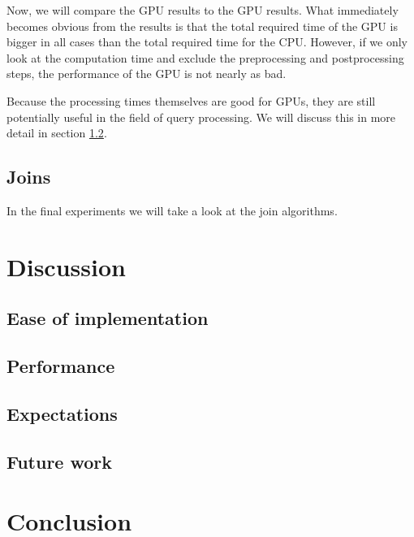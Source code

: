 \documentclass[a4paper,titlepage]{article}
\begin{document}
Now, we will compare the GPU results to the GPU results. What immediately becomes obvious from the results is that the total required time of the GPU is bigger in all cases than the total required time for the CPU. However, if we only look at the computation time and exclude the preprocessing and postprocessing steps, the performance of the GPU is not nearly as bad.

Because the processing times themselves are good for GPUs, they are still potentially useful in the field of query processing. We will discuss this in more detail in section \ref{sec:discussion-performance}.

\subsection{Joins}
In the final experiments we will take a look at the join algorithms.

\section{Discussion}
\label{sec:discussion}

\subsection{Ease of implementation}

\subsection{Performance}
\label{sec:discussion-performance}

\subsection{Expectations}

\subsection{Future work}

\section{Conclusion}
\label{sec:conclusion}

{}

\end{document}
